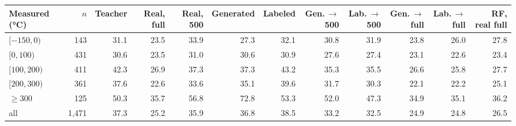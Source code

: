 \begin{tabular}{@{}lrrrrrrrrrrr@{}}
\toprule
Measured \Tg{} (\unit{\celsius}) & $n$ & Teacher & Real, full & Real, 500 & Generated & Labeled & Gen.\,$\rightarrow$\,500 & Lab.\,$\rightarrow$\,500 & Gen.\,$\rightarrow$\,full & Lab.\,$\rightarrow$\,full & RF, real full \\
\midrule
$[-150, 0)$ & 143 & 31.1 & 23.5 & 33.9 & 27.3 & 32.1 & 30.8 & 31.9 & 23.8 & 26.0 & 27.8 \\
$[0, 100)$ & 431 & 30.6 & 23.5 & 31.0 & 30.6 & 30.9 & 27.6 & 27.4 & 23.1 & 22.6 & 23.4 \\
$[100, 200)$ & 411 & 42.3 & 26.9 & 37.3 & 37.3 & 43.2 & 35.3 & 35.5 & 26.6 & 25.8 & 27.7 \\
$[200, 300)$ & 361 & 37.6 & 22.6 & 33.6 & 35.1 & 39.6 & 31.7 & 30.3 & 22.1 & 22.2 & 25.1 \\
$\geq 300$ & 125 & 50.3 & 35.7 & 56.8 & 72.8 & 53.3 & 52.0 & 47.3 & 34.9 & 35.1 & 36.2 \\
all & 1,471 & 37.3 & 25.2 & 35.9 & 36.8 & 38.5 & 33.2 & 32.5 & 24.9 & 24.8 & 26.5 \\
\bottomrule
\end{tabular}

